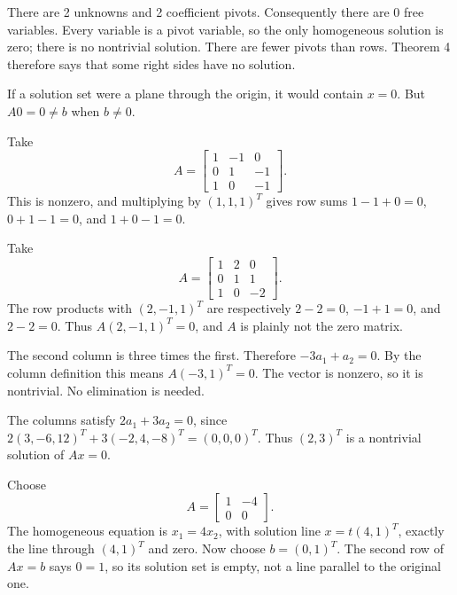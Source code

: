 There are 2 unknowns and 2 coefficient pivots.
Consequently there are 0 free variables.
Every variable is a pivot variable, so the only homogeneous
solution is zero; there is no nontrivial solution.
There are fewer pivots than rows. Theorem 4 therefore says that
some right sides have no solution.

If a solution set were a plane through the origin, it would contain
$x=0$. But $A0=0\ne b$ when $b\ne0$.

Take
\[A=\begin{bmatrix}1&-1&0\\0&1&-1\\1&0&-1\end{bmatrix}.\]
This is nonzero, and multiplying by $(1,1,1)^T$ gives row sums
$1-1+0=0$, $0+1-1=0$, and $1+0-1=0$.

Take
\[A=\begin{bmatrix}1&2&0\\0&1&1\\1&0&-2\end{bmatrix}.\]
The row products with $(2,-1,1)^T$ are respectively
$2-2=0$, $-1+1=0$, and $2-2=0$.
Thus $A(2,-1,1)^T=0$, and $A$ is plainly not the zero matrix.

The second column is three times the first. Therefore
$-3a_1+a_2=0$. By the column definition this means
$A(-3,1)^T=0$. The vector is nonzero, so it is nontrivial.
No elimination is needed.

The columns satisfy $2a_1+3a_2=0$, since
$2(3,-6,12)^T+3(-2,4,-8)^T=(0,0,0)^T$.
Thus $(2,3)^T$ is a nontrivial solution of $Ax=0$.

Choose
\[A=\begin{bmatrix}1&-4\\0&0\end{bmatrix}.\]
The homogeneous equation is $x_1=4x_2$, with solution line
$x=t(4,1)^T$, exactly the line through $(4,1)^T$ and zero.
Now choose $b=(0,1)^T$. The second row of $Ax=b$ says $0=1$,
so its solution set is empty, not a line parallel to the original one.

